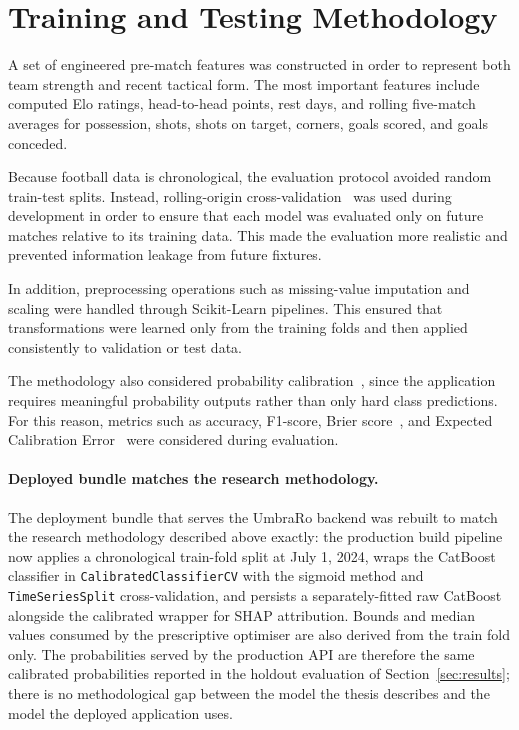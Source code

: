 \section{Training and Testing Methodology}
\label{sec:methodology}

A set of engineered pre-match features was constructed in order to represent both team strength and recent tactical form. The most important features include computed Elo ratings, head-to-head points, rest days, and rolling five-match averages for possession, shots, shots on target, corners, goals scored, and goals conceded.

Because football data is chronological, the evaluation protocol avoided random train-test splits. Instead, rolling-origin cross-validation~\cite{bergmeir2018cv} was used during development in order to ensure that each model was evaluated only on future matches relative to its training data. This made the evaluation more realistic and prevented information leakage from future fixtures.

In addition, preprocessing operations such as missing-value imputation and scaling were handled through Scikit-Learn pipelines. This ensured that transformations were learned only from the training folds and then applied consistently to validation or test data.

The methodology also considered probability calibration~\cite{platt1999probabilistic,niculescu2005predicting}, since the application requires meaningful probability outputs rather than only hard class predictions. For this reason, metrics such as accuracy, F1-score, Brier score~\cite{brier1950verification}, and Expected Calibration Error~\cite{guo2017calibration} were considered during evaluation.

\paragraph{Deployed bundle matches the research methodology.}
The deployment bundle that serves the UmbraRo backend was rebuilt to match the research methodology described above exactly: the production build pipeline now applies a chronological train-fold split at July 1, 2024, wraps the CatBoost classifier in \texttt{CalibratedClassifierCV} with the sigmoid method and \texttt{TimeSeriesSplit} cross-validation, and persists a separately-fitted raw CatBoost alongside the calibrated wrapper for SHAP attribution. Bounds and median values consumed by the prescriptive optimiser are also derived from the train fold only. The probabilities served by the production API are therefore the same calibrated probabilities reported in the holdout evaluation of Section~\ref{sec:results}; there is no methodological gap between the model the thesis describes and the model the deployed application uses.

